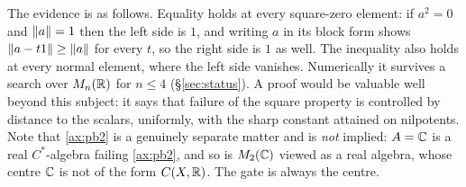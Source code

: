 \begin{remark}
The evidence is as follows.  Equality holds at every square-zero element: if
$a^2=0$ and $\left\lVert a\right\rVert=1$ then the left side is $1$, and writing $a$ in its
block form shows $\left\lVert a-t1\right\rVert\ge\left\lVert a\right\rVert$ for every $t$, so the right side is
$1$ as well.  The inequality also holds at every normal element, where the left
side vanishes.  Numerically it survives a search over $M_n(\mathbb{R})$ for
$n\le4$ (\S\ref{sec:status}).  A proof would be valuable well beyond this
subject: it says that failure of the square property is controlled by distance
to the scalars, uniformly, with the sharp constant attained on nilpotents.
Note that \eqref{ax:pb2} is a genuinely separate matter and is \emph{not} implied:
$A=\mathbb{C}$ is a real $C^*$-algebra failing \eqref{ax:pb2}, and so is $M_2(\mathbb{C})$
viewed as a real algebra, whose centre $\mathbb{C}$ is not of the form $C(X,\mathbb{R})$.  The
gate is always the centre.
\end{remark}
